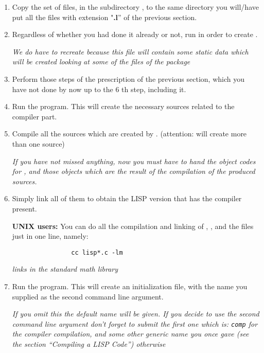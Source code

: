 \begin{enumerate}
\item
     Copy  the set of files, in the subdirectory , to the same
     directory you
     will/have put all the files with extension "{\bf .l}'' of the previous
     section.
\item
     Regardless of whether you had done it already or not,
     run  in order to create .

     {\em We do have to recreate   because
          this file will contain some static data which will
          be created looking at some of the files of the 
          package
     }
\item
     Perform those steps of the prescription of the previous section,
     which you have not done by now up to the 6 th step, including it.
\item
     Run the  program. This will create  the necessary \C sources
     related to the compiler part.
\item
     Compile all the \C sources which are created by .
      (attention:  will create more than one \C source)

     {\em If you have not missed anything, now you must have to hand
          the object codes for ,  and those
          objects
          which are the result of the compilation of the 
          produced \C sources.}
\item
     Simply link all of them to obtain the LISP version that has
     the compiler present.

     {\bf UNIX users:} You can do all the compilation and linking
     of , , and the  files
     just in one line, namely:
     \begin{verbatim}
                cc lisp*.c -lm
     \end{verbatim}
     {\em {} links in the standard math library}
\item
     Run the  program. This will create an initialization
     file, with the name you supplied as the second
     command line argument.

     {\em If you omit this the default name 
      will be given.
      If you decide to use the second command line argument don't
      forget to submit the first one which is: {\tt comp} for
      the compiler compilation,
       and some other generic name you once gave (see the section
      ``Compiling a LISP Code'') otherwise

}
\end{enumerate}
